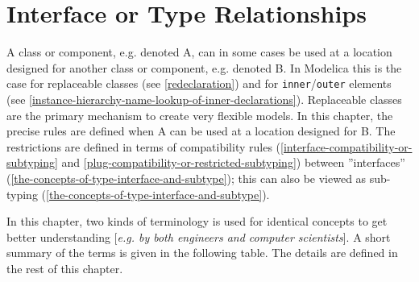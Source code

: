 \chapter{Interface or Type Relationships}

A class or component, e.g. denoted A, can in some cases be used at a
location designed for another class or component, e.g. denoted B. In
Modelica this is the case for replaceable classes (see \autoref{redeclaration}) and
for \lstinline[basicstyle=\ttfamily]!inner!/\lstinline[basicstyle=\ttfamily]!outer! elements (see \autoref{instance-hierarchy-name-lookup-of-inner-declarations}).
Replaceable classes are the
primary mechanism to create very flexible models. In this chapter, the
precise rules are defined when A can be used at a location designed for
B. The restrictions are defined in terms of compatibility rules
(\autoref{interface-compatibility-or-subtyping} and \autoref{plug-compatibility-or-restricted-subtyping}) between ''interfaces'' (\autoref{the-concepts-of-type-interface-and-subtype}); this can
also be viewed as sub-typing (\autoref{the-concepts-of-type-interface-and-subtype}).

In this chapter, two kinds of terminology is used for identical concepts
to get better understanding {[}\emph{e.g. by both engineers and computer
scientists}{]}. A short summary of the terms is given in the following
table. The details are defined in the rest of this chapter.

